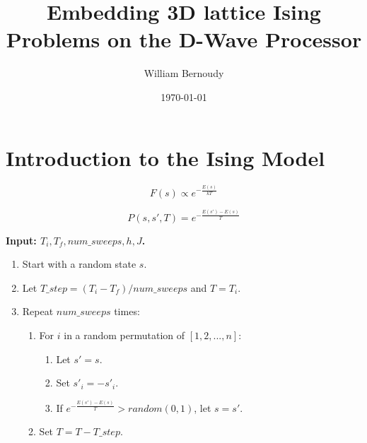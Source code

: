 \documentclass[11pt]{article}
\title{\textbf{Embedding 3D lattice Ising Problems on the D-Wave Processor}}
\author{William Bernoudy}
\date{\today}
\newcommand{\?}{\stackrel{?}{=}}
\begin{document}
\maketitle

\section{Introduction to the Ising Model}

$$F(s) \propto e^{-\frac{E(s)}{kT}}$$

$$P(s, s', T) = e^{-\frac{E(s')-E(s)}{T}}$$

\textbf{Input: $T_i, T_f, num\_sweeps, h, J$.}
\begin{enumerate}
\item Start with a random state $s$.
\item Let $T\_step = (T_i - T_f)/num\_sweeps$ and $T = T_i$.
\item Repeat $num\_sweeps$ times:
	\begin{enumerate}
	\item For $i$ in a random permutation of $[1,2,...,n]$:
		\begin{enumerate}
		\item Let $s' = s$.
		\item Set $s'_i = -s'_i$.
		\item If $e^{-\frac{E(s')-E(s)}{T}} > random(0,1)$, let $s = s'$.
		\end{enumerate}
		\item Set $T = T - T\_step$.
	\end{enumerate}
\end{enumerate}
\end{document}
